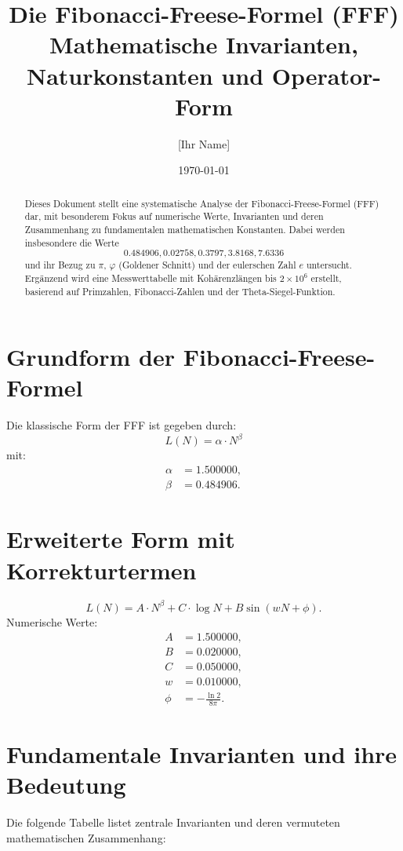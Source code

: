 \documentclass[a4paper,12pt]{article}
\title{Die Fibonacci-Freese-Formel (FFF) \\ 
Mathematische Invarianten, Naturkonstanten und Operator-Form}
\author{[Ihr Name]}
\date{\today}
\begin{document}
\maketitle

\begin{abstract}
Dieses Dokument stellt eine systematische Analyse der Fibonacci-Freese-Formel (FFF) dar, mit besonderem Fokus auf numerische Werte, Invarianten und deren Zusammenhang zu fundamentalen mathematischen Konstanten. Dabei werden insbesondere die Werte 
\[
0.484906, 0.02758, 0.3797, 3.8168, 7.6336
\]
und ihr Bezug zu $\pi$, $\varphi$ (Goldener Schnitt) und der eulerschen Zahl $e$ untersucht. Ergänzend wird eine Messwerttabelle mit Kohärenzlängen bis $2 \times 10^6$ erstellt, basierend auf Primzahlen, Fibonacci-Zahlen und der Theta-Siegel-Funktion.
\end{abstract}

\section{Grundform der Fibonacci-Freese-Formel}
Die klassische Form der FFF ist gegeben durch:
\begin{equation}
L(N) = \alpha \cdot N^\beta
\end{equation}
mit:
\begin{align*}
\alpha &= 1.500000, \\
\beta &= 0.484906.
\end{align*}

\section{Erweiterte Form mit Korrekturtermen}
\begin{equation}
L(N) = A \cdot N^\beta + C \cdot \log N + B \sin(w N + \phi).
\end{equation}
Numerische Werte:
\begin{align*}
A &= 1.500000, \\
B &= 0.020000, \\
C &= 0.050000, \\
w &= 0.010000, \\
\phi &= -\frac{\ln 2}{8\pi}.
\end{align*}

\section{Fundamentale Invarianten und ihre Bedeutung}
Die folgende Tabelle listet zentrale Invarianten und deren vermuteten mathematischen Zusammenhang:
\end{document}
